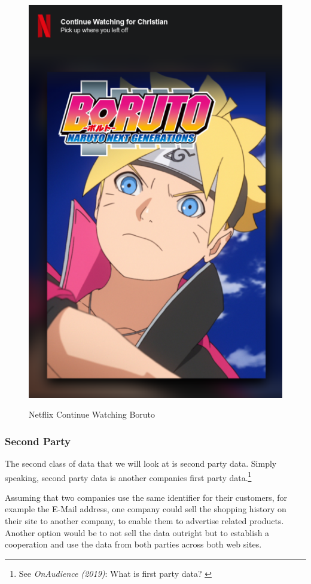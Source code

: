 \begin{figure}[H]
\centering
\caption {Netflix Continue Watching Boruto}
\includegraphics[scale=0.6]{images/continue-boruto.png}
\label{fig:boruto}
\end{figure}

\subsubsection{Second Party}

The second class of data that we will look at is second party data. Simply speaking, second party data is another companies first party data.\footnote{See \textit{OnAudience (2019)}: What is first party data? \cite{firstParty}}

Assuming that two companies use the same identifier for their customers, for example the E-Mail address, one company could sell the shopping history on their site to another company, to enable them to advertise related products. Another option would be to not sell the data outright but to establish a cooperation and use the data from both parties across both web sites.

